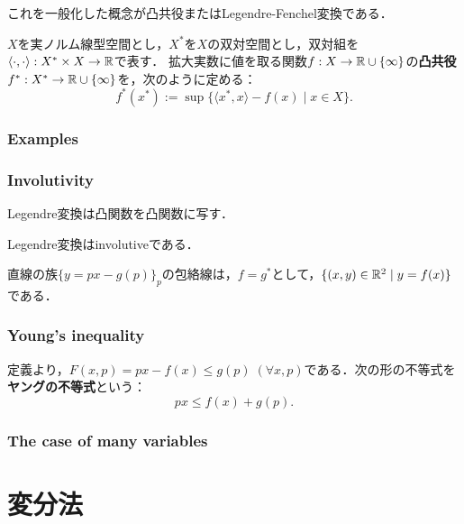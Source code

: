 \documentclass[uplatex, dvipdfmx]{jsreport}
\begin{document}
これを一般化した概念が凸共役またはLegendre-Fenchel変換である．

\begin{definition}
    $X$を実ノルム線型空間とし，$X^*$を$X$の双対空間とし，双対組を$\langle\cdot,\cdot\rangle:X^*\times X\to\mathbb{R}$で表す．
    拡大実数に値を取る関数$f:X\to\mathbb{R}\cup\{\infty\}$の\textbf{凸共役}$f^*:X^*\to\mathbb{R}\cup\{\infty\}$を，次のように定める：
    \[ f^*(x^*):=\sup\{\langle x^*,x\rangle-f(x)\mid x\in X\}. \]
\end{definition}

\subsection{Examples}

\subsection{Involutivity}

\begin{proposition}
    Legendre変換は凸関数を凸関数に写す．
\end{proposition}

\begin{theorem}
    Legendre変換はinvolutiveである．
\end{theorem}

\begin{corollary}
    直線の族$\{y=px-g(p)\}_{p}$の包絡線は，$f=g^*$として，$\{(x,y)\in\mathbb{R}^2\mid y=f(x)\}$である．
\end{corollary}

\subsection{Young's inequality}

\begin{definition}
    定義より，$F(x,p)=px-f(x)\le g(p)\;(\forall x,p)$である．次の形の不等式を\textbf{ヤングの不等式}という：
    \[ px\le f(x)+g(p). \]
\end{definition}

\subsection{The case of many variables}

\chapter{変分法}
\end{document}
